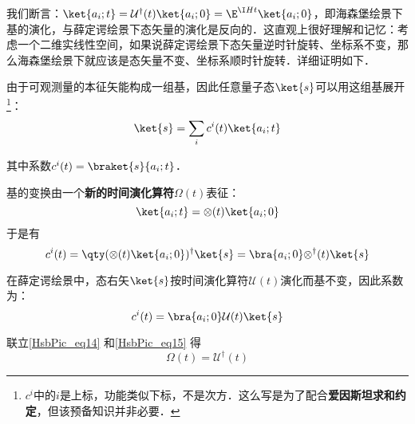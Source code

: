 我们断言：$\ket{a_i; t} = \mathcal{U}^\dagger(t)\ket{a_i; 0} = \E^{\I H t}\ket{a_i; 0}$，即海森堡绘景下基的演化，与薛定谔绘景下态矢量的演化是反向的．这直观上很好理解和记忆：考虑一个二维实线性空间，如果说薛定谔绘景下态矢量逆时针旋转、坐标系不变，那么海森堡绘景下就应该是态矢量不变、坐标系顺时针旋转．详细证明如下．

由于可观测量的本征矢能构成一组基，因此任意量子态$\ket{s}$可以用这组基展开\footnote{$c^i$中的$i$是上标，功能类似下标，不是次方．这么写是为了配合\textbf{爱因斯坦求和约定}，但该预备知识并非必要．}：
\begin{equation}\label{HsbPic_eq12}
\ket{s} = \sum_i c^i(t)\ket{a_i; t}
\end{equation}

其中系数$c^i(t)=\braket{s}{a_i; t}$．


基的变换由一个\textbf{新的时间演化算符}$\mathcal{\Omega}(t)$表征：
\begin{equation}\label{HsbPic_eq13}
\ket{a_i; t} = \mathcal{\Omega}(t)\ket{a_i; 0}
\end{equation}
于是有
\begin{equation}\label{HsbPic_eq14}
c^i(t) = \qty(\mathcal{\Omega}(t)\ket{a_i; 0})^\dagger\ket{s} = \bra{a_i; 0}\mathcal{\Omega}^\dagger(t)\ket{s}
\end{equation}

在薛定谔绘景中，态右矢$\ket{s}$按时间演化算符$\mathcal{U}(t)$演化而基不变，因此系数为：
\begin{equation}\label{HsbPic_eq15}
c^i(t) = \bra{a_i; 0}\mathcal{U}(t)\ket{s}
\end{equation}

联立\autoref{HsbPic_eq14} 和\autoref{HsbPic_eq15} 得
\begin{equation}
\mathcal{\Omega}(t)=\mathcal{U}^\dagger(t)
\end{equation}






